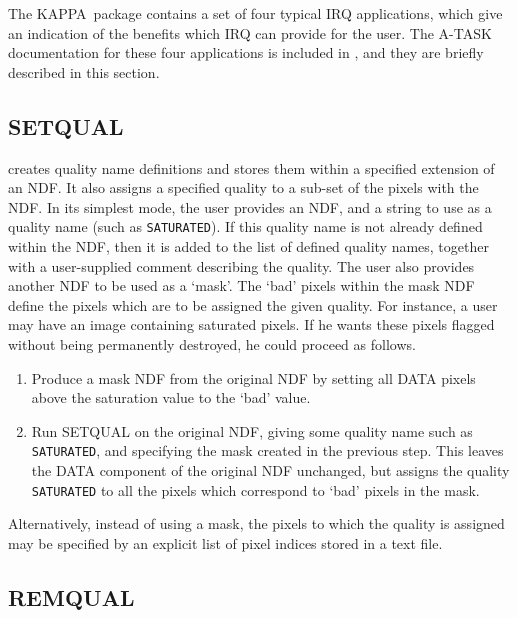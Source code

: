 \documentclass[twoside,11pt,nolof]{starlink}
\providecommand{\KAPPA}{{\footnotesize KAPPA}\normalsize}
\begin{document}
The \KAPPA\ package contains a set of four typical IRQ applications,
which give an indication of the benefits which IRQ can provide for the
user. The A-TASK documentation for these four applications is included
in , and they are briefly described
in this section.

\subsection{SETQUAL}

 creates quality name definitions and
stores them within a specified extension of an NDF. It also assigns a
specified quality to a sub-set of the pixels with the NDF. In its
simplest mode, the user provides an NDF, and a string to use as a quality
name (such as \texttt{SATURATED}). If this quality name is not already
defined within the NDF, then it is added to the list of defined quality
names, together with a user-supplied comment describing the quality. The
user also provides another NDF to be used as a `mask'. The `bad' pixels
within the mask NDF define the pixels which are to be assigned the given
quality. For instance, a user may have an image containing saturated
pixels. If he wants these pixels flagged without being permanently
destroyed, he could proceed as follows.

\begin{enumerate}

\item Produce a mask NDF from the original NDF by setting all DATA pixels
above the saturation value to the `bad' value.

\item Run SETQUAL on the original NDF, giving some quality name such as
\texttt{SATURATED}, and specifying the mask created in the previous step. This
leaves the DATA component of the original NDF unchanged, but assigns the
quality \texttt{SATURATED} to all the pixels which correspond to `bad'
pixels in the mask.

\end{enumerate}

Alternatively, instead of using a mask, the pixels to which the quality is
assigned may be specified by an explicit list of pixel indices stored in a
text file.

\subsection{REMQUAL}
\end{document}
